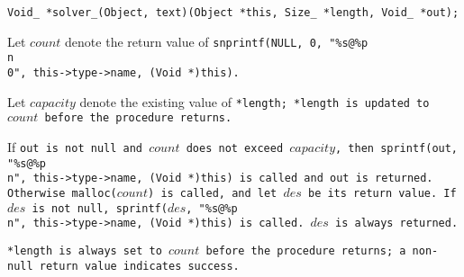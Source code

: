 
\tt{Void_ *solver_(Object, text)(Object *this, Size_ *length, Void_ *out);}


Let $count$ denote the return value of
\tt{snprintf(NULL, 0, "\%s@\%p\\n\\0", this->type->name, (Void *)this)}.

Let $capacity$ denote the existing value of \tt{*length};
\tt{*length} is updated to $count$ before the procedure returns.

If \tt{out} is not null and $count$ does not exceed $capacity$, then
\tt{sprintf(out, "\%s@\%p\\n", this->type->name,} \tt{(Void *)this)}
is called and \tt{out} is returned.
Otherwise \tt{malloc(}$count$\tt{)} is called, and let $des$ be its return value.
If $des$ is not null,
\tt{sprintf(}$des$\tt{, "\%s@\%p\\n", this->type->name, (Void *)this)} is called.
$des$ is always returned.

\note \tt{*length} is always set to $count$ before the procedure returns;
a non-null return value indicates success.
